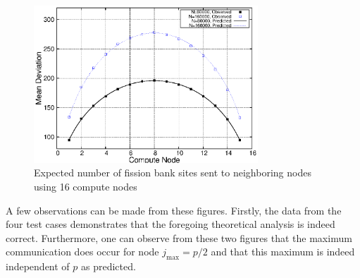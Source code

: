 \begin{figure}[h!]
  \centering
  \includegraphics[width=0.75\textwidth]{figures/mean_deviance/plot16.eps}
  \caption{Expected number of fission bank sites sent to neighboring
    nodes using 16 compute nodes}
  \label{fig:mean-deviance16}
\end{figure}

A few observations can be made from these figures. Firstly, the data
from the four test cases demonstrates that the foregoing theoretical
analysis is indeed correct. Furthermore, one can observe from these
two figures that the maximum communication does occur for node
$j_{\text{max}} = p/2$ and that this maximum is indeed independent of
$p$ as predicted.

